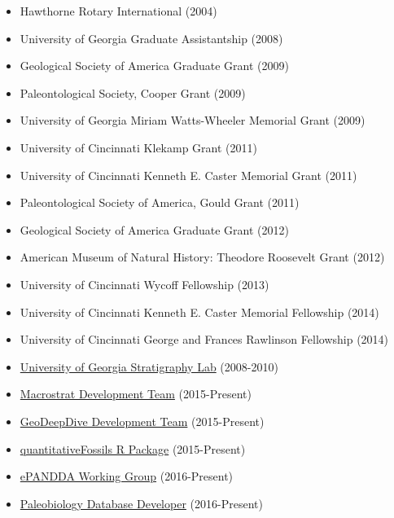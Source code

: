 \documentclass[12pt, a4paper]{awesome-cv}
\begin{document}
\fontsize{10pt}{1em}\bodyfontlight\upshape\color{text}
\begin{itemize}[leftmargin=*]
\item{Hawthorne Rotary International (2004)}
\item{University of Georgia Graduate Assistantship (2008)}
\item{Geological Society of America Graduate Grant (2009)}
\item{Paleontological Society, Cooper Grant (2009)}
\item{University of Georgia Miriam Watts-Wheeler Memorial Grant (2009)}
\item{University of Cincinnati Klekamp Grant (2011)}
\item{University of Cincinnati Kenneth E. Caster Memorial Grant (2011)}
\item{Paleontological Society of America, Gould Grant (2011)}
\item{Geological Society of America Graduate Grant (2012)}
\item{American Museum of Natural History: Theodore Roosevelt Grant (2012)}
\item{University of Cincinnati Wycoff Fellowship (2013)}
\item{University of Cincinnati Kenneth E. Caster Memorial Fellowship (2014)}
\item{University of Cincinnati George and Frances Rawlinson Fellowship (2014)}
\end{itemize}

\fontsize{10pt}{1em}\bodyfontlight\upshape\color{text}
\begin{itemize}[leftmargin=*]
\item{\href{http://strata.uga.edu/}{University of Georgia Stratigraphy Lab} (2008-2010)}
\item{\href{https://macrostrat.org/}{Macrostrat Development Team} (2015-Present)}
\item{\href{https://geodeepdive.org/}{GeoDeepDive Development Team} (2015-Present)}
\item{\href{https://github.com/aazaff/paleobiologyDatabase.R}{quantitativeFossils R Package} (2015-Present)}
\item{\href{https://steppe.org/epandda/}{ePANDDA Working Group} (2016-Present)}
\item{\href{https://paleobiodb.org/#/people}{Paleobiology Database Developer} (2016-Present)}
\end{itemize}
\end{document}
